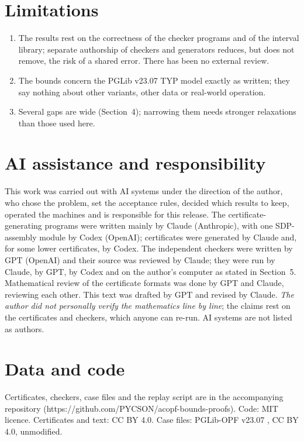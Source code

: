 \documentclass[10pt]{article}
\begin{document}
\section{Limitations}
\begin{enumerate}
\item The results rest on the correctness of the checker programs and of the interval library; separate authorship of
checkers and generators reduces, but does not remove, the risk of a shared error. There has been no external review.
\item The bounds concern the PGLib v23.07 TYP model exactly as written; they say nothing about other variants, other data or
real-world operation.
\item Several gaps are wide (Section~4); narrowing them needs stronger relaxations than those used here.
\end{enumerate}

\section*{AI assistance and responsibility}
This work was carried out with AI systems under the direction of the author, who chose the problem, set the acceptance
rules, decided which results to keep, operated the machines and is responsible for this release. The certificate-generating
programs were written mainly by Claude (Anthropic), with one SDP-assembly module by Codex (OpenAI); certificates were
generated by Claude and, for some lower certificates, by Codex. The independent checkers were written by GPT (OpenAI) and
their source was reviewed by Claude; they were run by Claude, by GPT, by Codex and on the author's computer as stated in
Section~5. Mathematical review of the certificate formats was done by GPT and Claude, reviewing each other. This text was
drafted by GPT and revised by Claude. \emph{The author did not personally verify the mathematics line by line}; the claims
rest on the certificates and checkers, which anyone can re-run. AI systems are not listed as authors.

\section*{Data and code}
Certificates, checkers, case files and the replay script are in the accompanying repository
(https://github.com/PYCSON/acopf-bounds-proofs). Code: MIT licence. Certificates and text: CC BY 4.0. Case files: PGLib-OPF v23.07 \cite{pglib},
CC BY 4.0, unmodified.



\end{document}
